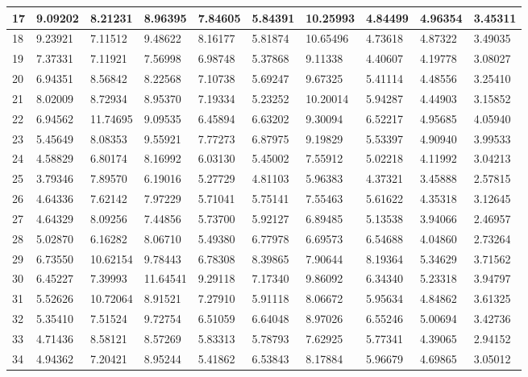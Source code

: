 \begin{table}[H]
{\begin{tabular}{|l|l|l|l|l|l|l|l|l|l|}
        17 & 9.09202 & 8.21231 & 8.96395 & 7.84605 & 5.84391 & 10.25993 & 4.84499 & 4.96354 & 3.45311 \\ \hline
        18 & 9.23921 & 7.11512 & 9.48622 & 8.16177 & 5.81874 & 10.65496 & 4.73618 & 4.87322 & 3.49035 \\ \hline
        19 & 7.37331 & 7.11921 & 7.56998 & 6.98748 & 5.37868 & 9.11338 & 4.40607 & 4.19778 & 3.08027 \\ \hline
        20 & 6.94351 & 8.56842 & 8.22568 & 7.10738 & 5.69247 & 9.67325 & 5.41114 & 4.48556 & 3.25410 \\ \hline
        21 & 8.02009 & 8.72934 & 8.95370 & 7.19334 & 5.23252 & 10.20014 & 5.94287 & 4.44903 & 3.15852 \\ \hline
        22 & 6.94562 & 11.74695 & 9.09535 & 6.45894 & 6.63202 & 9.30094 & 6.52217 & 4.95685 & 4.05940 \\ \hline
        23 & 5.45649 & 8.08353 & 9.55921 & 7.77273 & 6.87975 & 9.19829 & 5.53397 & 4.90940 & 3.99533 \\ \hline
        24 & 4.58829 & 6.80174 & 8.16992 & 6.03130 & 5.45002 & 7.55912 & 5.02218 & 4.11992 & 3.04213 \\ \hline
        25 & 3.79346 & 7.89570 & 6.19016 & 5.27729 & 4.81103 & 5.96383 & 4.37321 & 3.45888 & 2.57815 \\ \hline
        26 & 4.64336 & 7.62142 & 7.97229 & 5.71041 & 5.75141 & 7.55463 & 5.61622 & 4.35318 & 3.12645 \\ \hline
        27 & 4.64329 & 8.09256 & 7.44856 & 5.73700 & 5.92127 & 6.89485 & 5.13538 & 3.94066 & 2.46957 \\ \hline
        28 & 5.02870 & 6.16282 & 8.06710 & 5.49380 & 6.77978 & 6.69573 & 6.54688 & 4.04860 & 2.73264 \\ \hline
        29 & 6.73550 & 10.62154 & 9.78443 & 6.78308 & 8.39865 & 7.90644 & 8.19364 & 5.34629 & 3.71562 \\ \hline
        30 & 6.45227 & 7.39993 & 11.64541 & 9.29118 & 7.17340 & 9.86092 & 6.34340 & 5.23318 & 3.94797 \\ \hline
        31 & 5.52626 & 10.72064 & 8.91521 & 7.27910 & 5.91118 & 8.06672 & 5.95634 & 4.84862 & 3.61325 \\ \hline
        32 & 5.35410 & 7.51524 & 9.72754 & 6.51059 & 6.64048 & 8.97026 & 6.55246 & 5.00694 & 3.42736 \\ \hline
        33 & 4.71436 & 8.58121 & 8.57269 & 5.83313 & 5.78793 & 7.62925 & 5.77341 & 4.39065 & 2.94152 \\ \hline
        34 & 4.94362 & 7.20421 & 8.95244 & 5.41862 & 6.53843 & 8.17884 & 5.96679 & 4.69865 & 3.05012 \\ \hline

\end{tabular}}
\end{table}
